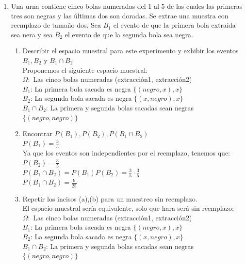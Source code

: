 \documentclass[12pt,a4paper]{report}
\begin{document}
\begin{enumerate}
   \item {
  Una urna contiene cinco bolas numeradas del 1 al 5 de las cuales las primeras tres son negras y las últimas dos son doradas. Se extrae una muestra con reemplazo de tamaño dos. Sea $B_{1}$ el evento de que la primera bola extraída sea nera y sea $B_{2}$ el evento de que la segunda bola sea negra.
\begin{enumerate}[label=\alph*) ]
	\item{Describir el espacio muestral para este experimento y exhibir los eventos $B_{1},B_{2}$ y $B_{1}\cap B_{2}$ \\

	Proponemos el siguiente espacio muestral:\\
	$\Omega:$ Las cinco bolas numeradas {(extracción1, extracción2)}\\
	$B_{1}$: La primera bola sacada es negra $\{(negro,x),x\}$\\
	$B_{2}$: La segunda bola sacada es negra $\{(x,negro),x\}$\\
	$B_{1}\cap B_{2}$: La primera y segunda bolas sacadas sean negras $\{(negro,negro)\}$\\

	}

	\item{Encontrar $P(B_{1}),P(B_{2}),P(B_{1}\cap B_{2})$\\
 	
 	$P(B_{1}) = \frac{3}{5}$\\
 	Ya que los eventos son independientes por el reemplazo, tenemos que:
 	$P(B_{2}) = \frac{3}{5}$\\
 	$P(B_{1}\cap B_{2}) = P(B_{1})P(B_{2}) = \frac{3}{5} \cdot \frac{3}{5}$\\
 	$P(B_{1}\cap B_{2}) = \frac{9}{25}$\\
	
	}

	\item{Repetir los incisos (a),(b) para un muestreo sin reemplazo. \\

	El espacio muestral sería equivalente, solo que hara será sin reemplazo:\\
	$\Omega:$ Las cinco bolas numeradas {(extracción1, extracción2)}\\
	$B_{1}$: La primera bola sacada es negra $\{(negro,x),x\}$\\
	$B_{2}$: La segunda bola sacada es negra $\{(x,negro),x\}$\\
	$B_{1}\cap B_{2}$: La primera y segunda bolas sacadas sean negras $\{(negro,negro)\}$\\

}
\end{enumerate}}
\end{enumerate}
\end{document}

